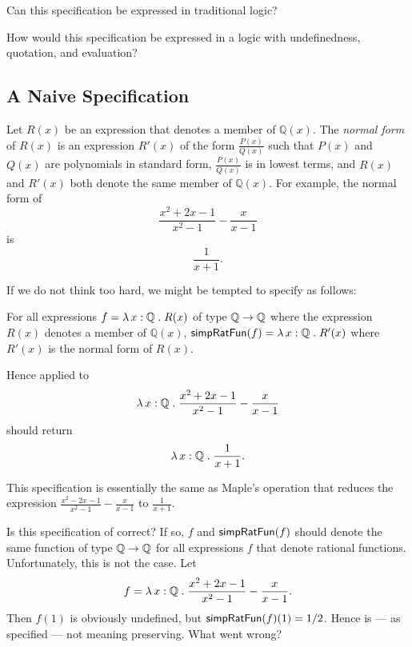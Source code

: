 \documentclass[fleqn]{llncs}
\begin{document}
  \item Can this specification be expressed in traditional logic?

  \item How would this specification be expressed in a logic with
    undefinedness, quotation, and evaluation?

\ee

\subsection{A Naive Specification}

Let $R(x)$ be an expression that denotes a member of $\mathbb{Q}(x)$.
The \emph{normal form} of $R(x)$ is an expression $R'(x)$ of the form
$\frac{P(x)}{Q(x)}$ such that $P(x)$ and $Q(x)$ are polynomials in
standard form, $\frac{P(x)}{Q(x)}$ is in lowest terms, and $R(x)$ and
$R'(x)$ both denote the same member of $\mathbb{Q}(x)$.  For example,
the normal form of \[\frac{x^2 + 2x - 1}{x^2 - 1} - \frac{x}{x - 1}\]
is \[\frac{1}{x + 1}.\]

If we do not think too hard, we might be tempted to specify
 as follows: 

\bi

  \item[] For all expressions $f = \lambda\, x : \mathbb{Q} \mathrel.
    R(x)$ of type $\mathbb{Q} \rightarrow \mathbb{Q}$ where the expression
    $R(x)$ denotes a member of $\mathbb{Q}(x)$, $\mbox{\sf simpRatFun}(f)
    = \lambda\, x : \mathbb{Q} \mathrel. R'(x)$ where $R'(x)$ is the
    normal form of $R(x)$.

\ei
%
Hence  applied to \[\lambda\, x : \mathbb{Q} \mathrel.
\frac{x^2 + 2x - 1}{x^2 - 1} - \frac{x}{x - 1}\] should return 
\[\lambda\, x : \mathbb{Q} \mathrel. \frac{1}{x + 1}.\]

This specification is essentially the same as Maple's 
operation that reduces the expression $\frac{x^2 - 2x - 1}{x^2 - 1} -
\frac{x}{x - 1}$ to $\frac{1}{x + 1}$.

Is this specification of  correct?  If so, $f$ and
$\mbox{\sf simpRatFun}(f)$ should denote the same function of type
$\mathbb{Q} \rightarrow \mathbb{Q}$ for all expressions $f$ that denote
rational functions.  Unfortunately, this is not the case.  Let \[f =
\lambda\, x : \mathbb{Q} \mathrel. \frac{x^2 + 2x - 1}{x^2 - 1} -
\frac{x}{x - 1}.\]  Then $f(1)$ is obviously undefined, but
$\mbox{\sf simpRatFun}(f)(1) = 1/2$.  Hence  is --- as
specified --- not meaning preserving.  What went wrong?
\end{document}
